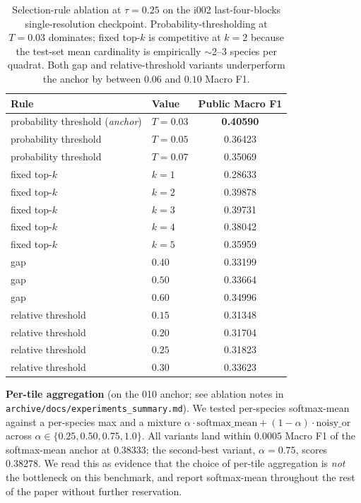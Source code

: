 \documentclass[sigconf]{ceurart}
\begin{document}
\begin{table}[ht]
\centering
\small
\begin{tabular}{llc}
\toprule
Rule & Value & Public Macro F1 \\
\midrule
probability threshold (\emph{anchor}) & $T{=}0.03$ & \textbf{0.40590} \\
probability threshold               & $T{=}0.05$ & 0.36423 \\
probability threshold               & $T{=}0.07$ & 0.35069 \\
\midrule
fixed top-$k$                       & $k{=}1$    & 0.28633 \\
fixed top-$k$                       & $k{=}2$    & 0.39878 \\
fixed top-$k$                       & $k{=}3$    & 0.39731 \\
fixed top-$k$                       & $k{=}4$    & 0.38042 \\
fixed top-$k$                       & $k{=}5$    & 0.35959 \\
\midrule
gap                                  & $0.40$    & 0.33199 \\
gap                                  & $0.50$    & 0.33664 \\
gap                                  & $0.60$    & 0.34996 \\
\midrule
relative threshold                   & $0.15$    & 0.31348 \\
relative threshold                   & $0.20$    & 0.31704 \\
relative threshold                   & $0.25$    & 0.31823 \\
relative threshold                   & $0.30$    & 0.33623 \\
\bottomrule
\end{tabular}
\caption{Selection-rule ablation at $\tau{=}0.25$ on the i002 last-four-blocks single-resolution checkpoint. Probability-thresholding at $T{=}0.03$ dominates; fixed top-$k$ is competitive at $k{=}2$ because the test-set mean cardinality is empirically $\sim$2--3 species per quadrat. Both gap and relative-threshold variants underperform the anchor by between $0.06$ and $0.10$ Macro F1.}
\label{tab:select_rule}
\end{table}

\textbf{Per-tile aggregation} (on the 010 anchor; see ablation notes in \texttt{archive/docs/experiments\_summary.md}). We tested per-species softmax-mean against a per-species max and a mixture $\alpha \cdot \text{softmax\_mean} + (1{-}\alpha) \cdot \text{noisy\_or}$ across $\alpha \in \{0.25, 0.50, 0.75, 1.0\}$. All variants land within $0.0005$ Macro F1 of the softmax-mean anchor at $0.38333$; the second-best variant, $\alpha{=}0.75$, scores $0.38278$. We read this as evidence that the choice of per-tile aggregation is \emph{not} the bottleneck on this benchmark, and report softmax-mean throughout the rest of the paper without further reservation.
\end{document}

